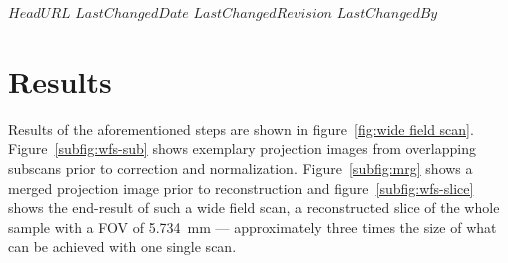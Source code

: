 \svnidlong
{$HeadURL$}
{$LastChangedDate$}
{$LastChangedRevision$}
{$LastChangedBy$}
\section{Results}
Results of the aforementioned steps are shown in figure~\ref{fig:wide field scan}. Figure~\ref{subfig:wfs-sub} shows exemplary projection images from overlapping subscans prior to correction and normalization. Figure~\ref{subfig:mrg} shows a merged projection image prior to reconstruction and figure~\ref{subfig:wfs-slice} shows the end-result of such a wide field scan, a reconstructed slice of the whole sample with a FOV of \SI{5.734}{\milli\meter} --- approximately three times the size of what can be achieved with one single scan.

